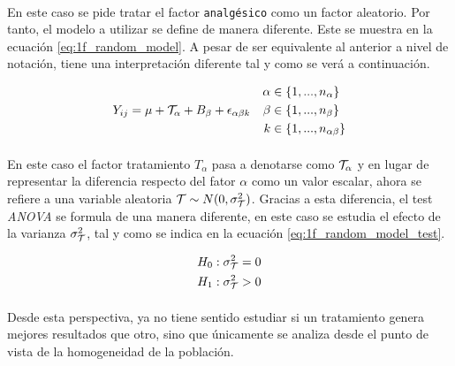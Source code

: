 \documentclass[11pt]{article}
\begin{document}
      \paragraph{}
      En este caso se pide tratar el factor \texttt{analgésico} como un factor aleatorio. Por tanto, el modelo a utilizar se define de manera diferente. Este se muestra en la ecuación \eqref{eq:1f_random_model}. A pesar de ser equivalente al anterior a nivel de notación, tiene una interpretación diferente tal y como se verá a continuación.

      \begin{align}
      \label{eq:1f_random_model}
        Y_{ij} = \mu + \mathcal{T}_\alpha + B_\beta + \epsilon_{\alpha \beta k} &&
        \begin{split}
          \alpha &\in \{1,...,n_\alpha \} \\
          \beta &\in \{1, ..., n_\beta \} \\
          k &\in \{1,...,  n_{\alpha\beta} \}
        \end{split}
      \end{align}

      \paragraph{}
      En este caso el factor tratamiento $T_\alpha$ pasa a denotarse como $\mathcal{T}_\alpha$ y en lugar de representar la diferencia respecto del fator $\alpha$ como un valor escalar, ahora se refiere a una variable aleatoria $\mathcal{T} \sim N(0, \sigma_{\mathcal{T}}^2)$. Gracias a esta diferencia, el test \emph{ANOVA} se formula de una manera diferente, en este caso se estudia el efecto de la varianza $\sigma_{\mathcal{T}}^2$, tal y como se indica en la ecuación \eqref{eq:1f_random_model_test}.

      \begin{align}
      \label{eq:1f_random_model_test}
        \begin{split}
          H_0: \sigma^2_{\mathcal{T}} = 0 \\
          H_1: \sigma^2_{\mathcal{T}} > 0
        \end{split}
      \end{align}

      \paragraph{}
      Desde esta perspectiva, ya no tiene sentido estudiar si un tratamiento genera mejores resultados que otro, sino que únicamente se analiza desde el punto de vista de la homogeneidad de la población.
\end{document}

